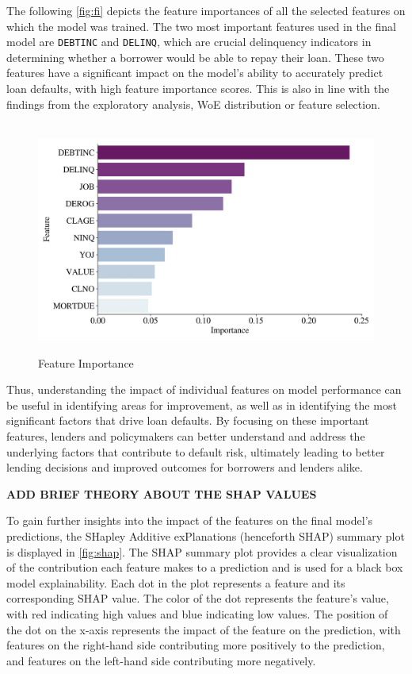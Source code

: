The following \autoref{fig:fi} depicts the feature importances of all the selected features on which the model was trained.
The two most important features used in the final model are \texttt{DEBTINC} and \texttt{DELINQ}, which are crucial delinquency indicators in determining whether a borrower would be able to repay their loan. These two features have a significant impact on the model's ability to accurately predict loan defaults, with high feature importance scores. This is also in line with the findings from the exploratory analysis, WoE distribution or feature selection.
\begin{figure}[H]
\centering
\caption{Feature Importance}\vspace{0.5em}
\label{fig:fi}\
\includegraphics[width=140mm]{Figures/Feature_Importances.jpg}
\vspace{-1em}
\end{figure}

Thus, understanding the impact of individual features on model performance can be useful in identifying areas for improvement, as well as in identifying the most significant factors that drive loan defaults.
By focusing on these important features, lenders and policymakers can better understand and address the underlying factors that contribute to default risk, ultimately leading to better lending decisions and improved outcomes for borrowers and lenders alike.

\textbf{ADD BRIEF THEORY ABOUT THE SHAP VALUES}

To gain further insights into the impact of the features on the final model's predictions, the SHapley Additive exPlanations (henceforth SHAP) summary plot is displayed in \autoref{fig:shap}.
The SHAP summary plot provides a clear visualization of the contribution each feature makes to a prediction and is used for a black box model explainability.
Each dot in the plot represents a feature and its corresponding SHAP value.
The color of the dot represents the feature's value, with red indicating high values and blue indicating low values.
The position of the dot on the x-axis represents the impact of the feature on the prediction, with features on the right-hand side contributing more positively to the prediction, and features on the left-hand side contributing more negatively.

